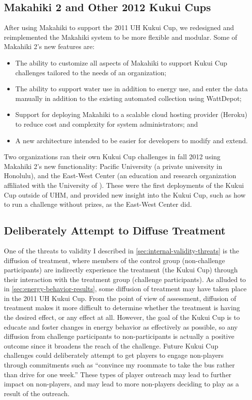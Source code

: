 \subsection{Makahiki 2 and Other 2012 Kukui Cups}
\label{sec:makahiki2}

After using Makahiki to support the 2011 UH Kukui Cup, we redesigned and reimplemented the Makahiki system to be more flexible and modular. Some of Makahiki 2's new features are:

\begin{itemize}
	\item The ability to customize all aspects of Makahiki to support Kukui Cup challenges tailored to the needs of an organization;
	\item The ability to support water use in addition to energy use, and enter the data manually in addition to the existing automated collection using WattDepot;
	\item Support for deploying Makahiki to a scalable cloud hosting provider (Heroku) to reduce cost and complexity for system administrators; and
	\item A new architecture intended to be easier for developers to modify and extend.
\end{itemize}

Two organizations ran their own Kukui Cup challenges in fall 2012 using Makahiki 2's new functionality: \Hawaii Pacific University (a private university in Honolulu), and the East-West Center (an education and research organization affiliated with the University of \Hawaii). These were the first deployments of the Kukui Cup outside of UHM, and provided new insight into the Kukui Cup, such as how to run a challenge without prizes, as the East-West Center did.


\subsection{Deliberately Attempt to Diffuse Treatment}

One of the threats to validity I described in \autoref{sec:internal-validity-threats} is the diffusion of treatment, where members of the control group (non-challenge participants) are indirectly experience the treatment (the Kukui Cup) through their interaction with the treatment group (challenge participants). As alluded to in \autoref{sec:energy-behavior-results}, some diffusion of treatment may have taken place in the 2011 UH Kukui Cup. From the point of view of assessment, diffusion of treatment makes it more difficult to determine whether the treatment is having the desired effect, or any effect at all. However, the goal of the Kukui Cup is to educate and foster changes in energy behavior as effectively as possible, so any diffusion from challenge participants to non-participants is actually a positive outcome since it broadens the reach of the challenge. Future Kukui Cup challenges could deliberately attempt to get players to engage non-players through commitments such as ``convince my roommate to take the bus rather than drive for one week.'' These types of player outreach may lead to further impact on non-players, and may lead to more non-players deciding to play as a result of the outreach.


